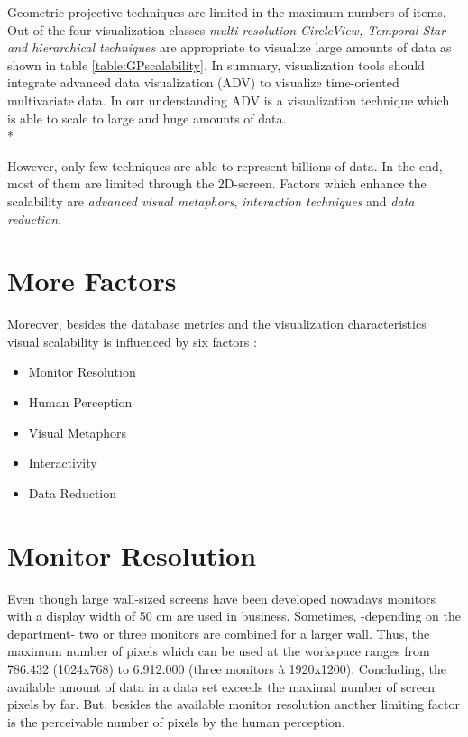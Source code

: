 Geometric-projective techniques are limited in the maximum numbers of items. Out of the four visualization classes \textit{multi-resolution CircleView, Temporal Star and hierarchical techniques} are appropriate to visualize large amounts of data as shown in table \ref{table:GPscalability}. 
In summary, visualization tools should integrate advanced data visualization (ADV) to visualize time-oriented multivariate data. In our understanding ADV is a visualization technique which is able to scale to large and huge amounts of data. \\*

However, only few techniques are able to represent billions of data. In the end, most of them are limited through the 2D-screen. Factors which enhance the scalability are \textit{advanced visual metaphors}, \textit{interaction techniques} and \textit{data reduction}. 



\section{More Factors} \label{factors}
Moreover, besides the database metrics and the visualization characteristics visual scalability is influenced by six factors \cite{Eick2002}: 
\begin{itemize}
    \item Monitor Resolution 
    \item Human Perception \cite{Keim2005,Deering1998}
    \item Visual Metaphors
    \item Interactivity
    \item Data Reduction
\end{itemize}

\section{Monitor Resolution}\label{resolution}
Even though large wall-sized screens have been developed nowadays monitors with a display width of 50 cm are used in business. Sometimes, -depending on the department- two or three monitors are combined for a larger wall. Thus, the maximum number of pixels which can be used at the workspace ranges from 786.432 (1024x768) to 6.912.000 (three monitors à 1920x1200).
Concluding, the available amount of data in a data set exceeds the maximal number of screen pixels by far. But, besides the available monitor resolution another limiting factor is the perceivable number of pixels by the human perception.

